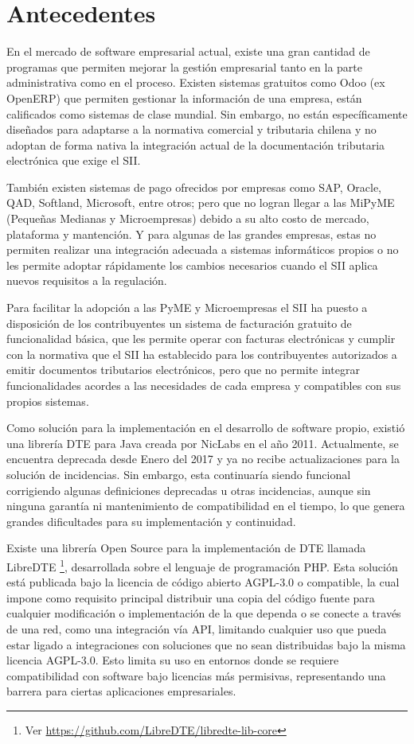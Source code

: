 \section{Antecedentes}

En el mercado de software empresarial actual, existe una gran cantidad de programas que permiten mejorar la gestión empresarial tanto en la parte administrativa como en el proceso. Existen sistemas gratuitos como Odoo (ex OpenERP) que permiten gestionar la información de una empresa, están calificados como sistemas  de clase mundial. Sin embargo, no están específicamente diseñados para adaptarse a la normativa comercial y tributaria chilena y no adoptan de forma nativa la integración actual de la documentación tributaria electrónica que exige el SII.

También existen sistemas de pago ofrecidos por empresas como SAP, Oracle, QAD, Softland, Microsoft, entre otros; pero que no logran llegar a las MiPyME (Pequeñas Medianas y Microempresas) debido a su alto costo de mercado, plataforma y mantención. Y para algunas de las grandes empresas, estas no permiten realizar una integración adecuada a sistemas informáticos propios o no les permite adoptar rápidamente los cambios necesarios cuando el SII aplica nuevos requisitos a la regulación.

Para facilitar la adopción a las PyME y Microempresas el SII ha puesto a disposición de los contribuyentes un sistema de facturación gratuito de funcionalidad básica, que les permite operar con facturas electrónicas y cumplir con la normativa que el SII ha establecido para los contribuyentes autorizados a emitir documentos tributarios electrónicos, pero que no permite integrar funcionalidades acordes a las necesidades de cada empresa y compatibles con sus propios sistemas.

Como solución para la implementación en el desarrollo de software propio, existió una librería DTE para Java creada por NicLabs en el año 2011. Actualmente, se encuentra deprecada desde Enero del 2017 y ya no recibe actualizaciones para la solución de incidencias. Sin embargo, esta continuaría siendo funcional corrigiendo algunas definiciones deprecadas u otras incidencias, aunque sin ninguna garantía ni mantenimiento de compatibilidad en el tiempo, lo que genera grandes dificultades para su implementación y continuidad.

Existe una librería Open Source para la implementación de DTE llamada LibreDTE \textcite{libreDTEGitHub} \footnote{Ver \url{https://github.com/LibreDTE/libredte-lib-core}}, desarrollada sobre el lenguaje de programación PHP. Esta solución está publicada bajo la licencia de código abierto AGPL-3.0 o compatible, la cual impone como requisito principal distribuir una copia del código fuente para cualquier modificación o implementación de la que dependa o se conecte a través de una red, como una integración vía API, limitando cualquier uso que pueda estar ligado a integraciones con soluciones que no sean distribuidas bajo la misma licencia AGPL-3.0. Esto limita su uso en entornos donde se requiere compatibilidad con software bajo licencias más permisivas, representando una barrera para ciertas aplicaciones empresariales.

